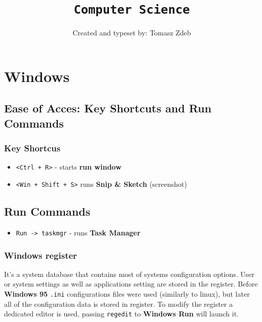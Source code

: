 \documentclass[11pt,a4paper]{article}
\date{\vspace{-3em}}
\title{\vspace{-2em}\texttt{Computer Science}\vspace{-0.5em}}
\author{Created and typeset by: Tomasz Zdeb}
\newcommand{\myline}[2]{\noindent\makebox[\linewidth]{\rule{#1cm}{#2pt}}}
\newcommand{\keyshortcut}[1]{\texttt{#1}}
\begin{document}
\maketitle
\myline{16}{1}

\section{Windows}

\subsection{Ease of Acces: Key Shortcuts and Run Commands}

\subsubsection{Key Shortcus}
\begin{itemize}
\item \keyshortcut{<Ctrl + R>} - starts \textbf{run window}
\item \keyshortcut{<Win + Shift + S>} runs \textbf{Snip \& Sketch} (screenshot)
\end{itemize}

\subsection{Run Commands}
\begin{itemize}
\item \keyshortcut{Run -> taskmgr} - runs \textbf{Task Manager}
\end{itemize}

\subsubsection{Windows register}
It's a system database that contains most of systems configuration options. User or system settings as well as applications setting are stored in the register. Before \textbf{Windows 95} \texttt{.ini} configurations files were used (similarly to linux), but later all of the configuration data is stored in register. To modify the register a dedicated editor is used, passing \texttt{regedit} to \textbf{Windows Run} will launch it.\\
\end{document}
